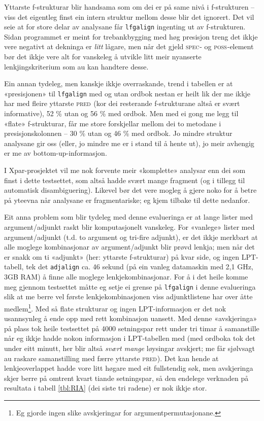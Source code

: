 \documentclass[12pt,a4paper,oneside,draft]{report}
\newcommand{\F}[2]{\textsc{#1}\ensuremath{_{#2}}}
\newcommand{\SPEC}{\F{spec}{}}
\newcommand{\POSS}{\F{poss}{}}
\newcommand{\PRED}{\F{pred}{}}
\begin{document}
Yttarste f-strukturar blir handsama som om dei er på same nivå i
 f-strukturen -- viss det eigentleg finst ein intern struktur mellom
 desse blir det ignorert. Det vil seie at for store delar av analysane
 får \texttt{lfgalign} ingenting ut av f-strukturen.  Sidan programmet er
 meint for trebankbygging med høg presisjon treng det ikkje vere
 negativt at dekninga er \emph{litt} lågare, men når det gjeld \SPEC{}- og
 \POSS{}-element bør det ikkje vere alt for vanskeleg å utvikle litt
 meir nyanserte lenkjingskriterium som au kan handtere desse. 

Ein annan tydeleg, men kanskje ikkje overraskande, trend i tabellen er
 at «presisjonen» til \texttt{lfgalign} med og utan ordbok nestan er heilt
 lik der me ikkje har med fleire yttarste \PRED{} (kor dei resterande
 f-strukturane altså er svært informative), 52 \% utan og 56 \% med
 ordbok. Men med ei gong me legg til «flate» f-strukturar, får me
 store forskjellar mellom dei to metodane i presisjonskolonnen -- 30 \%
 utan og 46 \% med ordbok. Jo mindre struktur analysane gir oss (eller,
 jo mindre me er i stand til å hente ut), jo meir avhengig er me av
 bottom-up-informasjon.

I Xpar-prosjektet vil me nok forvente meir «komplette» analysar enn
 dei som finst i dette testsettet, som altså hadde svært mange
 fragment (og i tillegg til automatisk disambiguering). Likevel bør
 det vere mogleg å gjere noko for å betre på yteevna når analysane er
 fragmentariske; eg kjem tilbake til dette nedanfor.

Eit anna problem som blir tydeleg med denne evalueringa er at lange
 lister med argument/adjunkt raskt blir komputasjonelt vanskeleg. For
 «vanlege» lister med argument/adjunkt (t.d. to argument og tri-fire
 adjunkt), er det ikkje merkbart at alle moglege kombinasjonar av
 argument/adjunkt blir prøvd lenkja; men når det er snakk om ti
 «adjunkt» (her: yttarste f-strukturar) på kvar side, og ingen
 LPT-tabell, tek det \texttt{adjalign} ca. 46 sekund (på ein vanleg
 datamaskin med 2,1 GHz, 3GB RAM) å finne alle moglege
 lenkjekombinasjonar. For å i det heile komme meg gjennom testsettet
 måtte eg setje ei grense på \texttt{lfgalign} i denne evalueringa slik at me
 berre vel første lenkjekombinasjonen viss adjunktlistene har over
 åtte medlem\footnote{Eg gjorde ingen slike avskjeringar for argumentpermutasjonane. }. Med så flate strukturar og ingen LPT-informasjon
 er det nok usannsynleg å ende opp med rett kombinasjon uansett. Med
 denne «avskjeringa» på plass tok heile testsettet på 4000 setningspar
 rett under tri timar å samanstille når eg ikkje hadde nokon
 informasjon i LPT-tabellen med (med ordboka tok det under eitt
 minutt, her blir altså \emph{svært mange} løysingar avskjert; me får
 sjølvsagt au raskare samanstilling med færre yttarste \PRED{}). Det
 kan hende at lenkjeoverlappet hadde vore litt høgare med eit
 fullstendig søk, men avskjeringa skjer berre på omtrent kvart tiande
 setningspar, så den endelege verknaden på resultata i tabell
 \ref{tbl:RIA} (dei siste tri radene) er nok ikkje stor.
\end{document}
